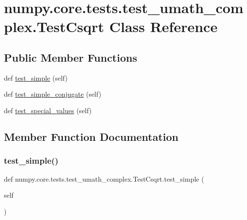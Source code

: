 \hypertarget{classnumpy_1_1core_1_1tests_1_1test__umath__complex_1_1TestCsqrt}{}\section{numpy.\+core.\+tests.\+test\+\_\+umath\+\_\+complex.\+Test\+Csqrt Class Reference}
\label{classnumpy_1_1core_1_1tests_1_1test__umath__complex_1_1TestCsqrt}
\subsection*{Public Member Functions}
\begin{DoxyCompactItemize}
\item 
def \hyperlink{classnumpy_1_1core_1_1tests_1_1test__umath__complex_1_1TestCsqrt_a70a259ae6b9bfde382c566c91800b235}{test\+\_\+simple} (self)
\item 
def \hyperlink{classnumpy_1_1core_1_1tests_1_1test__umath__complex_1_1TestCsqrt_a45d79ad3c0b25ebe1a802fb8bea518b0}{test\+\_\+simple\+\_\+conjugate} (self)
\item 
def \hyperlink{classnumpy_1_1core_1_1tests_1_1test__umath__complex_1_1TestCsqrt_a4b15590ce400e7d9e19b5b36c725379b}{test\+\_\+special\+\_\+values} (self)
\end{DoxyCompactItemize}


\subsection{Member Function Documentation}
\mbox{\label{classnumpy_1_1core_1_1tests_1_1test__umath__complex_1_1TestCsqrt_a70a259ae6b9bfde382c566c91800b235}} 
\subsubsection{\texorpdfstring{test\+\_\+simple()}{test\_simple()}}
{\footnotesize\ttfamily def numpy.\+core.\+tests.\+test\+\_\+umath\+\_\+complex.\+Test\+Csqrt.\+test\+\_\+simple (\begin{DoxyParamCaption}\item[{}]{self }\end{DoxyParamCaption})}

